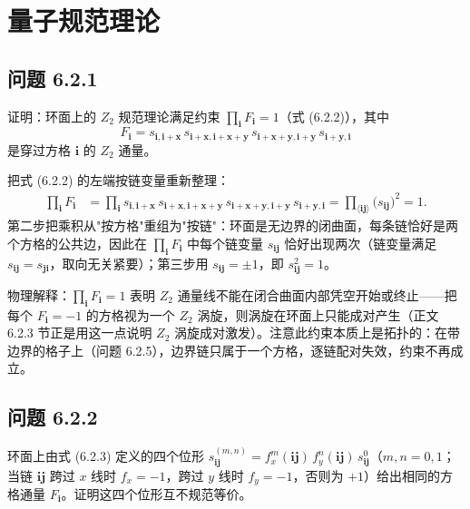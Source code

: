 \chapter{量子规范理论}

\section*{问题 6.2.1}
\begin{problem}
证明：环面上的 $Z_2$ 规范理论满足约束 $\prod_{\pmb i}F_{\pmb i}=1$（式 (6.2.2)），其中
\begin{equation*}
F_{\pmb i}=s_{\pmb i,\pmb i+\pmb x}\,s_{\pmb i+\pmb x,\pmb i+\pmb x+\pmb y}\,s_{\pmb i+\pmb x+\pmb y,\pmb i+\pmb y}\,s_{\pmb i+\pmb y,\pmb i}
\end{equation*}
是穿过方格 $\pmb i$ 的 $Z_2$ 通量。
\end{problem}
\solution

把式 (6.2.2) 的左端按链变量重新整理：
\begin{align*}
\prod_{\pmb i}F_{\pmb i}
&=\prod_{\pmb i}s_{\pmb i,\pmb i+\pmb x}\,s_{\pmb i+\pmb x,\pmb i+\pmb x+\pmb y}\,s_{\pmb i+\pmb x+\pmb y,\pmb i+\pmb y}\,s_{\pmb i+\pmb y,\pmb i}
=\prod_{\langle\pmb{ij}\rangle}\bigl(s_{\pmb{ij}}\bigr)^{2}=1 .
\end{align*}
第二步把乘积从"按方格"重组为"按链"：环面是无边界的闭曲面，每条链恰好是两个方格的公共边，因此在 $\prod_{\pmb i}F_{\pmb i}$ 中每个链变量 $s_{\pmb{ij}}$ 恰好出现两次（链变量满足 $s_{\pmb{ij}}=s_{\pmb{ji}}$，取向无关紧要）；第三步用 $s_{\pmb{ij}}=\pm1$，即 $s_{\pmb{ij}}^2=1$。

物理解释：$\prod_{\pmb i}F_{\pmb i}=1$ 表明 $Z_2$ 通量线不能在闭合曲面内部凭空开始或终止——把每个 $F_{\pmb i}=-1$ 的方格视为一个 $Z_2$ 涡旋，则涡旋在环面上只能成对产生（正文 6.2.3 节正是用这一点说明 $Z_2$ 涡旋成对激发）。注意此约束本质上是拓扑的：在带边界的格子上（问题 6.2.5），边界链只属于一个方格，逐链配对失效，约束不再成立。

\section*{问题 6.2.2}
\begin{problem}
环面上由式 (6.2.3) 定义的四个位形 $s^{(m,n)}_{\pmb{ij}}=f_x^{m}(\pmb{ij})\,f_y^{n}(\pmb{ij})\,s^0_{\pmb{ij}}$（$m,n=0,1$；当链 $\pmb{ij}$ 跨过 $x$ 线时 $f_x=-1$，跨过 $y$ 线时 $f_y=-1$，否则为 $+1$）给出相同的方格通量 $F_{\pmb i}$。证明这四个位形互不规范等价。
\end{problem}
\solution

